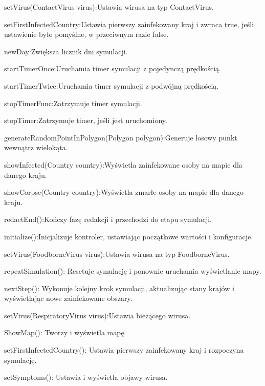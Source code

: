 \documentclass[a4paper]{article}
\begin{document}
\foreignlanguage{polish}{setVirus(ContactVirus virus):Ustawia wirusa na typ ContactVirus.}

\foreignlanguage{polish}{setFirstInfectedCountry:Ustawia pierwszy zainfekowany kraj i zwraca true, jeśli ustawienie było pomyślne, w przeciwnym razie false.}

\foreignlanguage{polish}{newDay:Zwiększa licznik dni symulacji.}

\foreignlanguage{polish}{startTimerOnce:Uruchamia timer symulacji z pojedynczą prędkością.}

\foreignlanguage{polish}{startTimerTwice:Uruchamia timer symulacji z podwójną prędkością.}

\foreignlanguage{polish}{stopTimerFunc:Zatrzymuje timer symulacji.}

\foreignlanguage{polish}{stopTimer:Zatrzymuje timer, jeśli jest uruchomiony.}

\foreignlanguage{polish}{generateRandomPointInPolygon(Polygon polygon):Generuje losowy punkt wewnątrz wielokąta.}

\foreignlanguage{polish}{showInfected(Country country):Wyświetla zainfekowane osoby na mapie dla danego kraju.}

\foreignlanguage{polish}{showCorpse(Country country):Wyświetla zmarłe osoby na mapie dla danego kraju.}

\foreignlanguage{polish}{redactEnd():Kończy fazę redakcji i przechodzi do etapu symulacji.}

\foreignlanguage{polish}{initialize():Inicjalizuje kontroler, ustawiając początkowe wartości i konfiguracje.}

\foreignlanguage{polish}{setVirus(FoodborneVirus virus):Ustawia wirusa na typ FoodborneVirus.}

\foreignlanguage{polish}{repeatSimulation(): Resetuje symulację i ponownie uruchamia wyświetlanie mapy.}

\foreignlanguage{polish}{nextStep(): Wykonuje kolejny krok symulacji, aktualizując stany krajów i wyświetlając nowe
zainfekowane obszary.}

\foreignlanguage{polish}{setVirus(RespiratoryVirus virus):Ustawia bieżącego wirusa.}

\foreignlanguage{polish}{ShowMap(): Tworzy i wyświetla mapę.}

\foreignlanguage{polish}{setFirstInfectedCountry(): Ustawia pierwszy zainfekowany kraj i rozpoczyna symulację.}

\foreignlanguage{polish}{setSymptoms(): Ustawia i wyświetla objawy wirusa.}
\end{document}
